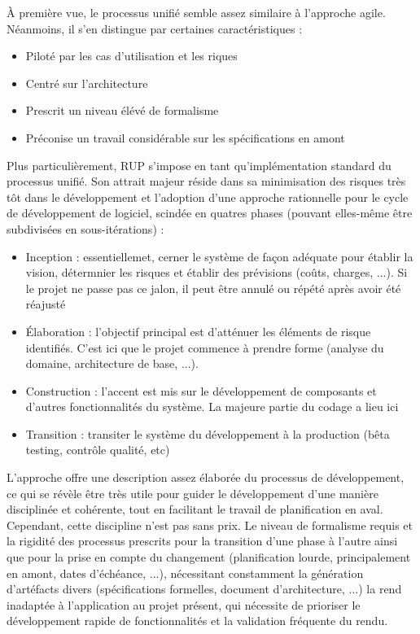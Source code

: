 \begin{spacing}{1.5}
À première vue, le processus unifié semble assez similaire à l'approche agile. Néanmoins, il s'en distingue par certaines caractéristiques :
\begin{itemize}
\item Piloté par les cas d'utilisation et les riques
    \item Centré sur l'architecture
    \item Prescrit un niveau élévé de formalisme
    \item Préconise un travail considérable sur les spécifications en amont
\end{itemize}
Plus particulièrement, RUP s'impose en tant qu'implémentation standard du processus unifié. Son attrait majeur réside dans sa minimisation des risques très tôt dans le développement et l'adoption d'une approche rationnelle pour le cycle de développement de logiciel, scindée en quatres phases (pouvant elles-même être subdivisées en sous-itérations) :
\begin{itemize}
    \item Inception : essentiellemet, cerner le système de façon adéquate pour établir la vision, détermnier les risques et établir des prévisions (coûts, charges, ...). Si le projet ne passe pas ce jalon, il peut être annulé ou répété après avoir été réajusté
    \item Élaboration : l'objectif principal est d'atténuer les éléments de risque identifiés. C'est ici que le projet commence à prendre forme (analyse du domaine, architecture de base, ...).
    \item Construction : l'accent est mis sur le développement de composants et d'autres fonctionnalités du système. La majeure partie du codage a lieu ici
    \item Transition : transiter le système du développement à la production (bêta testing, contrôle qualité, etc)
\end{itemize}
L'approche offre une description assez élaborée du processus de développement, ce qui se révèle être très utile pour guider le développement d'une manière disciplinée et cohérente, tout en facilitant le travail de planification en aval. Cependant, cette discipline n'est pas sans prix. Le niveau de formalisme requis et la rigidité des processus prescrits pour la transition d'une phase à l'autre ainsi que pour la prise en compte du changement (planification lourde, principalement en amont, dates d'échéance, ...), nécessitant constamment la génération d'artéfacts  divers (spécifications formelles, document d'architecture, ...) la rend inadaptée à l'application au projet présent, qui nécessite de prioriser le développement rapide de fonctionnalités et la validation fréquente du rendu.\\


\end{spacing}
